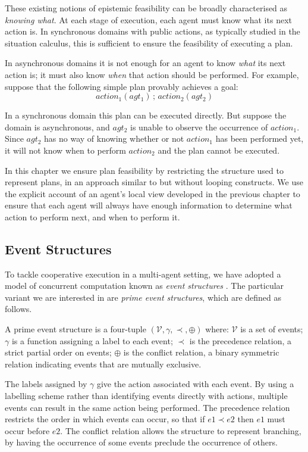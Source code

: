 These existing notions of epistemic feasibility can be broadly characterised
as \emph{knowing what}. At each stage of execution, each agent must
know what its next action is. In synchronous domains with public actions,
as typically studied in the situation calculus, this is sufficient
to ensure the feasibility of executing a plan.

In asynchronous domains it is not enough for an agent to know \emph{what}
its next action is; it must also know \emph{when} that action should
be performed. For example, suppose that the following simple plan
provably achieves a goal:\[
action_{1}(agt_{1})\,;\, action_{2}(agt_{2})\]


In a synchronous domain this plan can be executed directly. But suppose
the domain is asynchronous, and $agt_{2}$ is unable to observe the
occurrence of $action_{1}$. Since $agt_{2}$ has no way of knowing
whether or not $action_{1}$ has been performed yet, it will not know
when to perform $action_{2}$ and the plan cannot be executed.

In this chapter we ensure plan feasibility by restricting the structure
used to represent plans, in an approach similar to \citep{levesque98what_robots_can_do}
but without looping constructs. We use the explicit account of an
agent's local view developed in the previous chapter to ensure that
each agent will always have enough information to determine what action
to perform next, and when to perform it.


\subsection{Event Structures}

To tackle cooperative execution in a multi-agent setting, we have
adopted a model of concurrent computation known as \emph{event structures}
\citep{npw79event_structures}. The particular variant we are interested
in are \emph{prime event structures}, which are defined as follows.

\begin{defnL}
 A prime event structure is a
four-tuple $(\mathcal{V},\gamma,\prec,\oplus)$ where: $\mathcal{V}$
is a set of events; $\gamma$ is a function assigning a label to each
event; $\prec$ is the precedence relation, a strict partial order
on events; $\oplus$ is the conflict relation, a binary symmetric
relation indicating events that are mutually exclusive. 
\end{defnL}
The labels assigned by $\gamma$ give the action associated with each
event. By using a labelling scheme rather than identifying events
directly with actions, multiple events can result in the same action
being performed. The precedence relation restricts the order in which
events can occur, so that if $e1\prec e2$ then $e1$ must occur before
$e2$. The conflict relation allows the structure to represent branching,
by having the occurrence of some events preclude the occurrence of
others.

